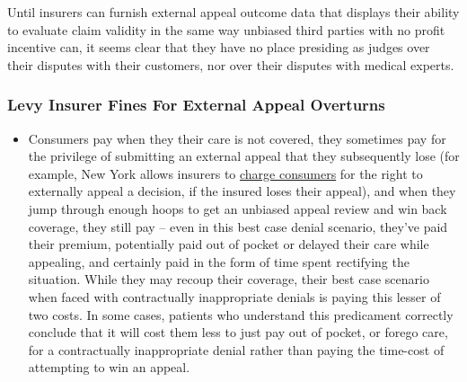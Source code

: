 \documentclass[12pt, a4paper,twoside,parskip=full]{report}
\theoremstyle{plain} %
\theoremstyle{definition} %
\theoremstyle{remark} %
\numberwithin{equation}{chapter}
\begin{document}
		Until insurers can furnish external appeal outcome data that displays their ability to evaluate claim validity in the same way unbiased third parties with no profit incentive can, it seems clear that they have no place presiding as judges over their disputes with their customers, nor over their disputes with medical experts. 
		
		\subsubsection{Levy Insurer Fines For External Appeal Overturns}
		
		\begin{itemize}
			\item Consumers pay when they their care is not covered, they sometimes pay for the privilege of submitting an external appeal that they subsequently lose (for example, New York allows insurers to \href{https://www.dfs.ny.gov/complaints/file_external_appeal}{charge consumers} for the right to externally appeal a decision, if the insured loses their appeal), and when they jump through enough hoops to get an unbiased appeal review and win back coverage, they still pay -- even in this best case denial scenario, they've paid their premium, potentially paid out of pocket or delayed their care while appealing, and certainly paid in the form of time spent rectifying the situation. While they may recoup their coverage, their best case scenario when faced with contractually inappropriate denials is paying this lesser of two costs. In some cases, patients who understand this predicament correctly conclude that it will cost them less to just pay out of pocket, or forego care, for a contractually inappropriate denial rather than paying the time-cost of attempting to win an appeal.
			

\end{itemize}
\end{document}
